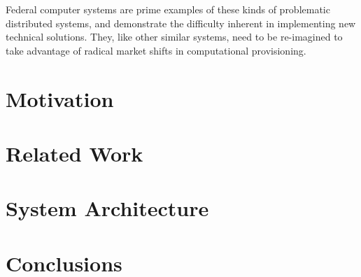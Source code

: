 \documentclass[12pt,letterpaper]{report}
\begin{document}
Federal computer systems are prime examples of these kinds of problematic distributed systems, and demonstrate the difficulty inherent in implementing new technical solutions.  They, like other similar systems, need to be re-imagined to take advantage of radical market shifts in computational provisioning.
\section{Motivation}

\section{Related Work}

\section{System Architecture}

\section{Conclusions}


\end{document}
